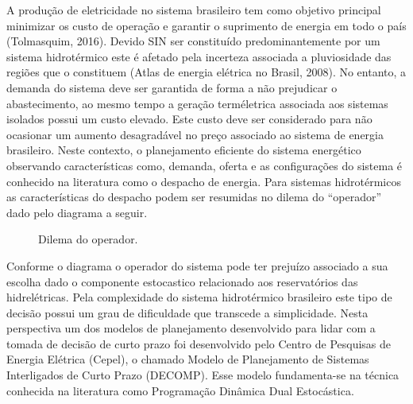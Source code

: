 \documentclass[12pt,fleqn]{article}
\begin{document}
 A produ\c c\~ao de eletricidade no sistema brasileiro tem como objetivo principal minimizar
os custo de opera\c c\~ao e garantir o suprimento de energia em todo o pa\'is (Tolmasquim, 2016). Devido SIN ser
constitu\'ido predominantemente por um sistema hidrot\'ermico este \'e afetado pela incerteza associada a pluviosidade
das regi\~oes que o constituem (Atlas de
energia el\'etrica no Brasil, 2008). No entanto, a demanda do sistema deve ser garantida de forma a n\~ao prejudicar o
abastecimento, ao mesmo tempo a gera\c c\~ao term\'eletrica associada aos sistemas isolados possui um custo elevado. Este custo deve ser considerado para n\~ao ocasionar um
aumento desagrad\'avel no pre\c co  associado ao sistema de energia brasileiro. 
Neste contexto, o planejamento eficiente do sistema energ\'etico observando caracter\'isticas como, demanda, oferta e
  as configura\c c\~oes do sistema \'e conhecido na literatura como o despacho de energia. Para sistemas
 hidrot\'ermicos as caracter\'isticas do despacho podem ser resumidas no dilema do
 ``operador'' dado pelo diagrama a seguir.
 {\setlength{\jot}{2pt}
 \begin{figure}[!h]
 \centering
 \caption {Dilema do operador.}  
 \label{fig1}
 \end{figure}
}
Conforme o diagrama o operador do sistema pode ter preju\'izo associado a sua escolha dado o componente estocastico
relacionado aos
reservat\'orios das hidrel\'etricas. Pela complexidade do sistema hidrot\'ermico
brasileiro este tipo de decis\~ao possui um grau de dificuldade que transcede a simplicidade. Nesta perspectiva um dos modelos de
planejamento desenvolvido para lidar com a tomada de decis\~ao de curto prazo foi desenvolvido pelo Centro de
Pesquisas de Energia El\'etrica (Cepel), o chamado Modelo de Planejamento de Sistemas Interligados de
Curto Prazo (DECOMP). Esse modelo fundamenta-se na t\'ecnica conhecida na literatura como Programa\c c\~ao Din\^amica
Dual Estoc\'astica.
\end{document}

